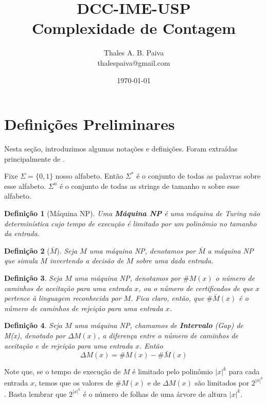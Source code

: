 \documentclass[paper=a4, fontsize=11pt]{scrartcl} %
\title{	
\normalfont \normalsize 
\textsc{DCC-IME-USP} \\ [25pt] %
\huge Complexidade de Contagem \\ %
}
\author{Thales A. B. Paiva \\ thalespaiva@gmail.com} %
\date{\normalsize\today} %
\newtheorem{definition}{Definição}
\numberwithin{equation}{section} %
\numberwithin{figure}{section} %
\numberwithin{table}{section} %
\numberwithin{definition}{section}
\numberwithin{theorem}{section}
\begin{document}
\maketitle %
\tableofcontents



\pagebreak
\section{Definições Preliminares}

Nesta seção, introduzimos algumas notações e definições. Foram extraídas principalmente de \cite{Fortnow97}.

Fixe $\Sigma = \{0, 1\}$ nosso alfabeto. Então $\Sigma^*$ é o conjunto de todas as palavras sobre esse alfabeto. $\Sigma^n$ é o conjunto de todas as strings de tamanho $n$ sobre esse alfabeto. 

\begin{definition}[Máquina NP] Uma \textbf{Máquina NP} é uma máquina de Turing não determinística cujo tempo de execução é limitado por um polinômio no tamanho da entrada.
\end{definition}

\begin{definition}[$\bar{M}$] Seja $M$ uma máquina NP, denotamos por \textbf{$\bar{M}$} a máquina NP que simula $M$ invertendo a decisão de $M$ sobre uma dada entrada.
\end{definition}

\begin{definition} Seja $M$ uma máquina NP, denotamos por $\#M(x)$ o número de caminhos de aceitação para uma entrada $x$, ou o número de certificados de que $x$ pertence à linguagem reconhecida por $M$. Fica claro, então, que $\#\bar{M}(x)$ é o número de caminhos de rejeição para uma entrada $x$.
\end{definition}

\begin{definition} Seja $M$ uma máquina NP, chamamos de \textbf{Intervalo} (\textit{Gap}) de M(x), denotado por $\Delta M(x)$, a diferença entre o número de caminhos de aceitação e de rejeição para uma entrada $x$. Então
\[
\Delta M(x) = \#M(x) - \#\bar{M}(x)
\]
\end{definition}

Note que, se o tempo de execução de $M$ é limitado pelo polinômio $|x|^k$ para cada entrada $x$, temos que os valores de $\#M(x)$ e de $\Delta M(x)$ são limitados por $2^{|x|^k}$. Basta lembrar que $2^{|x|^k}$ é o número de folhas de uma árvore de altura $|x|^k$.
\end{document}
